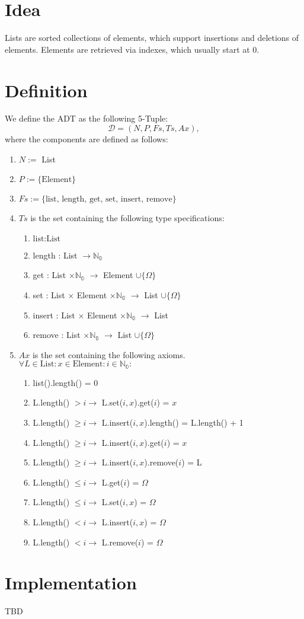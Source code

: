 \documentclass{article}
\begin{document}
\section*{Idea}
Lists are sorted collections of elements, which support insertions and deletions of elements. Elements are retrieved via indexes, which usually start at 0.


\section*{Definition}
We define the ADT as the following 5-Tuple:
\[\mathcal{D} = (N, P, Fs, Ts, Ax),\]
where the components are defined as follows:

\begin{enumerate}
 \item \(N :=\) List
 \item \(P := \{ \text{Element} \}\)
 \item \(Fs := \{ \text{list, length, get, set, insert, remove} \}\)
 \item \(Ts\) is the set containing the following type specifications:
	\begin{enumerate}
		\item \( \text{list} : \text{List} \)
		\item length : List \(\rightarrow \mathbb{N_0}\)
		\item get : List \(\times \mathbb{N_0}\) \(\rightarrow\) Element \(\cup \{\Omega\}\)
		\item set : List \(\times\) Element \(\times \mathbb{N_0}\) \(\rightarrow\) List \(\cup \{\Omega\}\)
		\item insert : List \(\times\) Element \(\times \mathbb{N_0}\) \(\rightarrow\) List
		\item remove : List \(\times \mathbb{N_0}\) \(\rightarrow\) List \(\cup \{\Omega\}\)
	\end{enumerate}
 \item \(Ax\) is the set containing the following axioms. \\
	\(\forall L \in \text{List} : x \in \text{Element} : i \in \mathbb{N_0} :\)
	\begin{enumerate}
		\item list().length() = 0
		\item L.length() \(> i \rightarrow\) L.set(\(i, x\)).get(\(i\)) = \(x\)
		\item L.length() \(\geq i \rightarrow\) L.insert(\(i, x\)).length() = L.length() + 1
		\item L.length() \(\geq i \rightarrow\) L.insert(\(i, x\)).get(\(i\)) = \(x\)
		\item L.length() \(\geq i \rightarrow\) L.insert(\(i, x\)).remove(\(i\)) = L
		\item L.length() \(\leq i \rightarrow\) L.get(\(i\)) = \(\Omega\)
		\item L.length() \(\leq i \rightarrow\) L.set(\(i, x\)) = \(\Omega\)
		\item L.length() \(< i \rightarrow\) L.insert(\(i, x\)) = \(\Omega\)
		\item L.length() \(< i \rightarrow\) L.remove(\(i\)) = \(\Omega\)
	\end{enumerate}
\end{enumerate}


\section*{Implementation}
TBD
\end{document}
